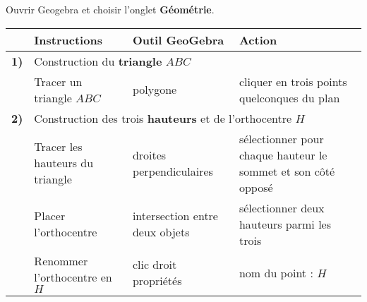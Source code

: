 \vspace*{-20mm}
\begin{enigme}
    \vspace*{-5mm}
    \begin{changemargin}{-5mm}{-15mm}
        Ouvrir Geogebra et choisir l'onglet \textbf{Géométrie}.
        \begin{tabular}{|cp{5.5cm}|p{4.5cm}|p{5cm}|}
            \hline
                                  & Instructions                                                                                          & Outil GeoGebra                 & Action                                                        \\
            \hline
            \textcolor{B1}{\bf1)} & \multicolumn{3}{l|}{Construction du {\bf triangle} $ABC$}                                                                                                                                              \\
                                  & Tracer un triangle $ABC$                                                                              & polygone                       & cliquer en trois points quelconques du plan                   \\
            \hline
            \textcolor{B1}{\bf2)} & \multicolumn{3}{l|}{Construction des trois {\bf hauteurs} et de l'orthocentre $H$}                                                                                                                     \\
                                  & Tracer les hauteurs du triangle                                                                       & droites perpendiculaires       & sélectionner pour chaque hauteur le sommet et son côté opposé \\
                                  & Placer l'orthocentre                                                                                  & intersection entre deux objets & sélectionner deux hauteurs parmi les trois                    \\
                                  & Renommer l'orthocentre en $H$                                                                         & clic droit propriétés          & nom du point : $H$                                            \\

\end{tabular}
\end{changemargin}
\end{enigme}
